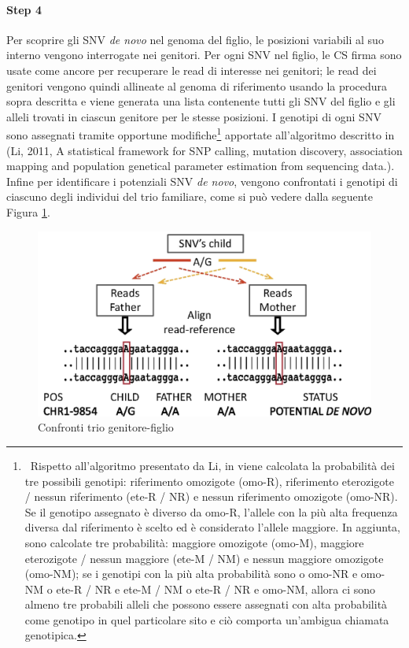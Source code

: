 \documentclass[../main.tex]{subfiles}
\begin{document}
\paragraph{Step 4} Per scoprire gli SNV \textit{de novo} nel genoma del figlio, le posizioni variabili al suo interno vengono interrogate nei genitori. Per ogni SNV nel figlio, le CS firma sono usate come ancore per recuperare le read di interesse nei genitori; le read dei genitori vengono quindi allineate al genoma di riferimento usando la procedura sopra descritta e viene generata una lista contenente tutti gli SNV del figlio e gli alleli trovati in ciascun genitore per le stesse posizioni. I genotipi di ogni SNV sono assegnati tramite opportune modifiche\footnote{\ Rispetto all'algoritmo presentato da Li, in \cite{gomez-romero2018cobasi} viene calcolata la probabilità dei tre possibili genotipi: riferimento omozigote (omo-R), riferimento eterozigote / nessun riferimento (ete-R / NR) e nessun riferimento omozigote (omo-NR). Se il genotipo assegnato è diverso da omo-R, l'allele con la più alta frequenza diversa dal riferimento è scelto ed è considerato l'allele maggiore. In aggiunta, sono calcolate tre probabilità: maggiore omozigote (omo-M), maggiore eterozigote / nessun maggiore (ete-M / NM) e nessun maggiore omozigote (omo-NM); se i genotipi con la più alta probabilità sono o omo-NR e omo-NM o ete-R / NR e ete-M / NM o ete-R / NR e omo-NM, allora ci sono almeno tre probabili alleli che possono essere assegnati con alta probabilità come genotipo in quel particolare sito e ciò comporta un'ambigua chiamata genotipica.} apportate all'algoritmo descritto in (Li, 2011, A statistical framework for SNP calling, mutation discovery, association mapping and population genetical parameter estimation from sequencing data.). Infine per identificare i potenziali SNV \textit{de novo}, vengono confrontati i genotipi di ciascuno degli individui del trio familiare, come si può vedere dalla seguente Figura \ref{fig:cobasi_align}.

 \begin{figure}[ht!]
	\centering
  	\captionsetup{justification=centering}
  	\includegraphics[scale=.20]{images/cobasi_align.png}
  	\caption{Confronti trio genitore-figlio}
  	\label{fig:cobasi_align}
\end{figure}
\end{document}
